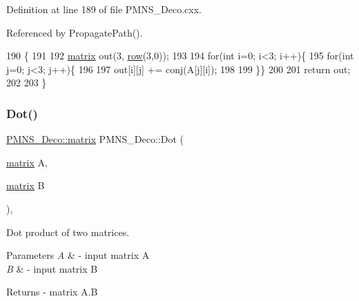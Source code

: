 Definition at line 189 of file P\+M\+N\+S\+\_\+\+Deco.\+cxx.



Referenced by Propagate\+Path().


\begin{DoxyCode}
190 \{
191 
192   \hyperlink{classOscProb_1_1PMNS__Deco_a77b4e0c041b6268910a270be0f5387c9}{matrix} out(3, \hyperlink{classOscProb_1_1PMNS__Deco_a34634741bc68bc1c524cf47f44e7f5b6}{row}(3,0));
193   
194   \textcolor{keywordflow}{for}(\textcolor{keywordtype}{int} i=0; i<3; i++)\{
195   \textcolor{keywordflow}{for}(\textcolor{keywordtype}{int} j=0; j<3; j++)\{
196   
197     out[i][j] += conj(A[j][i]);
198 
199   \}\}
200   
201   \textcolor{keywordflow}{return} out;
202 
203 \}
\end{DoxyCode}
\mbox{\label{classOscProb_1_1PMNS__Deco_a8d6b547de294c0d52d4208bde44fe171}} 
\subsubsection{\texorpdfstring{Dot()}{Dot()}}
{\footnotesize\ttfamily \hyperlink{classOscProb_1_1PMNS__Deco_a77b4e0c041b6268910a270be0f5387c9}{P\+M\+N\+S\+\_\+\+Deco\+::matrix} P\+M\+N\+S\+\_\+\+Deco\+::\+Dot (\begin{DoxyParamCaption}\item[{\hyperlink{classOscProb_1_1PMNS__Deco_a77b4e0c041b6268910a270be0f5387c9}{matrix}}]{A,  }\item[{\hyperlink{classOscProb_1_1PMNS__Deco_a77b4e0c041b6268910a270be0f5387c9}{matrix}}]{B }\end{DoxyParamCaption})\hspace{0.3cm}{\ttfamily [protected]}, {\ttfamily [virtual]}}

Dot product of two matrices.


\begin{DoxyParams}{Parameters}
{\em A} & -\/ input matrix A \\
\hline
{\em B} & -\/ input matrix B\\
\hline
\end{DoxyParams}
\begin{DoxyReturn}{Returns}
-\/ matrix A.\+B 
\end{DoxyReturn}


